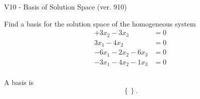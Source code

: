 \begin{exercise}
  \begin{exerciseTitle}V10 - Basis of Solution Space (ver. 910)\end{exerciseTitle}
  \begin{exerciseStatement}
    Find a basis for the solution space of the homogeneous system 
\begin{align*}
 + 3 x_ 2 -3 x_ 3 &= 0  \\ 
  3 x_ 1 -4 x_ 2 &= 0  \\ 
  -6 x_ 1 -2 x_ 2 -6 x_ 3 &= 0  \\ 
  -3 x_ 1 -4 x_ 2 -1 x_ 3 &= 0  \\ 
 \end{align*}


 
  \end{exerciseStatement}

  \begin{exerciseAnswer}
   A basis is   
\[\left\{\right\}.\]

  


  \end{exerciseAnswer}
\end{exercise}